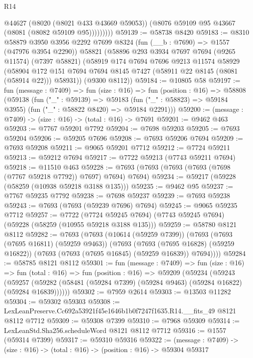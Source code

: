 \begin{lexlean}{R14}
\begin{coremodule}
                @44627
                (@8020 (@8021 @433 @43669 @59053))
                (@8076 @59109 @95 @43667 (@8081 (@8082 @59109 @95)))))))))
@59139 := @58738 @8420
@59183 := @8310
    @58879
    @3950
    @3956
    @2292
    @7699
    @8324
    (fun (__b : @7690) => @1557 (@47976 @3954 @2290))
    @58821
    (@58896
      @293
      @3934
      @7697
      @7694
      (@9265 @11574)
      (@7397 @58821)
      (@58919
        @174
        @7694
        @7696
        @9213
        @11574
        @58929
        (@58904 @172 @151 @7694 @7694 @8145 @7427 (@58911 @22 @8145 (@8081 (@58914 @22))) @58931))
      (@9300 @8112))
@59184 := @10805 @58
@59197 := fun (message : @7409) =>
  fun (size : @16) =>
  fun (position : @16) =>
  @58808
    (@59138
      (fun ("_" : @59139) =>
      @59183 (fun ("_" : @58823) => @59184 @3955) (fun ("_" : @58822 @8420) => @59184 @2291)))
@59200 := (message : @7409) -> (size : @16) -> (total : @16) -> @7691
@59201 := @9462 @463
@59203 := @7767 @59201 @7792
@59204 := @7698 @59203
@59205 := @7693 @59204
@59206 := @59205 @7696
@59208 := @7693 @59206 @7694
@59209 := @7693 @59208
@59211 := @9065 @59201 @7712
@59212 := @7724 @59211
@59213 := @59212 @7694
@59217 := @7722 @59213 (@7743 @59211 @7694)
@59218 := @11510 @463
@59228 := @7693 (@7693 (@7693 (@7693 (@7698 (@7767 @59218 @7792)) @7697) @7694) @7694)
@59234 := @59217 (@59228 (@58259 (@10938 @59218 @3188 @135)))
@59235 := @9462 @95
@59237 := @7767 @59235 @7792
@59238 := @7698 @59237
@59239 := @7693 @59238
@59243 := @7693 (@7693 (@59239 @7696) @7694)
@59245 := @9065 @59235 @7712
@59257 := @7722
    (@7724 @59245 @7694)
    (@7743 @59245 @7694)
    (@59228 (@58259 (@10955 @59218 @3188 @135)))
@59259 := @58780 @8121 @8112
@59282 := @7693
    (@7693
      (@10614 (@59259 @7399))
      (@7693
        (@7693 (@7695 @16811) (@59259 @9463))
        (@7693
          (@7693 (@7695 @16828) (@59259 @16822))
          (@7693 (@7693 (@7695 @16845) (@59259 @16839)) @7694))))
@59284 := @58785 @8121 @8112
@59301 := fun (message : @7409) =>
  fun (size : @16) =>
  fun (total : @16) =>
  fun (position : @16) =>
  @59209
    (@59234
      (@59243
        (@59257 (@59282 (@58481 (@59284 @7399) (@59284 @9463) (@59284 @16822) (@59284 @16839))))))
@59302 := @7959 @2614
@59303 := @13503 @11282
@59304 := @59302 @59303
@59308 := LexLeanPreserve.Cc692a53921f45e1646b1b0f7247f1635.R14.__fits_49 @8121 @8112 @7712
@59309 := @59308 @7399
@59310 := @7968 @59309
@59314 := LexLeanStd.Sha256.scheduleWord @8121 @8112 @7712
@59316 := @1557 (@59314 @7399)
@59317 := @59310 @59316
@59322 := (message : @7409) -> (size : @16) -> (total : @16) -> (position : @16) -> @59304 @59317

\end{coremodule}
\end{lexlean}
